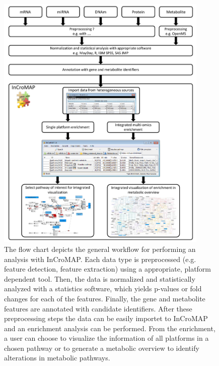 \documentclass[final,5p,times,twocolumn]{elsarticle}
\begin{document}
\begin{figure}
\center
\includegraphics[width=0.9\textwidth]{InCroMAP_workflow.pdf}
\caption{The flow chart depicts the general workflow for performing an analysis with InCroMAP. Each data type is preprocessed (e.g. feature detection, feature extraction) using a appropriate, platform dependent tool. Then, the data is normalized and statistically analyzed with a statistics software, which yields p-values or fold changes for each of the features. Finally, the gene and metabolite features are annotated with candidate identifiers. After these preprocessing steps the data can be easily importet to InCroMAP and an enrichment analysis can be performed. From the enrichment, a user can choose to visualize the information of all platforms in a chosen pathway or to generate a metabolic overview to identify alterations in metabolic pathways.}
\label{fig:incromap-workflow}
\end{figure}
\end{document}
